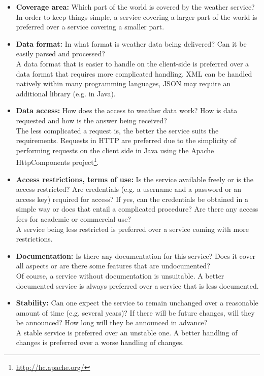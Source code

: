 \begin{itemize}
  \item \textbf{Coverage area:} Which part of the world is covered by the weather service?\\
  In order to keep things simple, a service covering a larger part of the world is preferred over a service covering a smaller part.
  \item \textbf{Data format:} In what format is weather data being delivered? Can it be easily parsed and processed?\\
  A data format that is easier to handle on the client-side is preferred over a data format that requires more complicated handling. XML can be handled natively within many programming languages, JSON may require an additional library (e.g. in Java). %
  \item \textbf{Data access:} How does the access to weather data work? How is data requested and how is the answer being received?\\
  The less complicated a request is, the better the service suits the requirements. Requests in HTTP are preferred due to the simplicity of performing requests on the client side in Java using the Apache HttpComponents project\footnote{\href{http://hc.apache.org/}{http://hc.apache.org/}}.
  \item \textbf{Access restrictions, terms of use:} Is the service available freely or is the access restricted? Are credentials (e.g. a username and a password or an access key) required for access? If yes, can the credentials be obtained in a simple way or does that entail a complicated procedure? Are there any access fees for academic or commercial use?\\
  A service being less restricted is preferred over a service coming with more restrictions.
  \item \textbf{Documentation:} Is there any documentation for this service? Does it cover all aspects or are there some features that are undocumented?\\
  Of course, a service without documentation is unsuitable. A better documented service is always preferred over a service that is less documented.
  \item \textbf{Stability:} Can one expect the service to remain unchanged over a reasonable amount of time (e.g. several years)? If there will be future changes, will they be announced? How long will they be announced in advance?\\
  A stable service is preferred over an unstable one. A better handling of changes is preferred over a worse handling of changes.

\end{itemize}
